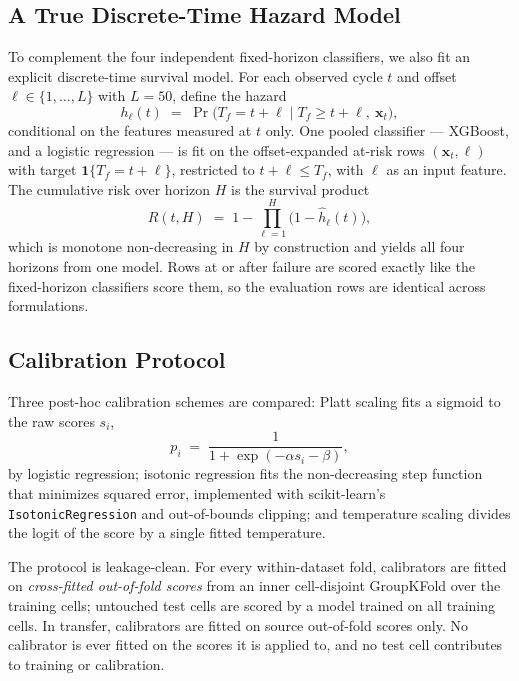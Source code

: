 \documentclass[preprint,12pt]{elsarticle}
\begin{document}
\subsection{A True Discrete-Time Hazard Model}
To complement the four independent fixed-horizon classifiers, we also fit an explicit discrete-time survival model. For each observed cycle $t$ and offset $\ell\in\{1,\dots,L\}$ with $L{=}50$, define the hazard
\begin{equation}\label{eq:hazard}
h_\ell(t) \;=\; \Pr\!\bigl(T_f = t{+}\ell \mid T_f \ge t{+}\ell,\ \mathbf{x}_t\bigr),
\end{equation}
conditional on the features measured at $t$ only. One pooled classifier --- XGBoost, and a logistic regression --- is fit on the offset-expanded at-risk rows $(\mathbf{x}_t, \ell)$ with target $\mathbf{1}\{T_f = t{+}\ell\}$, restricted to $t{+}\ell \le T_f$, with $\ell$ as an input feature. The cumulative risk over horizon $H$ is the survival product
\begin{equation}\label{eq:survival}
R(t,H) \;=\; 1 - \prod_{\ell=1}^{H}\bigl(1-\hat h_\ell(t)\bigr),
\end{equation}
which is monotone non-decreasing in $H$ by construction and yields all four horizons from one model. Rows at or after failure are scored exactly like the fixed-horizon classifiers score them, so the evaluation rows are identical across formulations.

\subsection{Calibration Protocol}
Three post-hoc calibration schemes are compared: Platt scaling fits a sigmoid to the raw scores $s_i$,
\begin{equation}\label{eq:platt}
p_i \;=\; \frac{1}{1+\exp(-\alpha s_i - \beta)},
\end{equation}
by logistic regression; isotonic regression \cite{zadrozny2002transforming} fits the non-decreasing step function that minimizes squared error, implemented with scikit-learn's \texttt{IsotonicRegression} and out-of-bounds clipping; and temperature scaling divides the logit of the score by a single fitted temperature.

The protocol is leakage-clean. For every within-dataset fold, calibrators are fitted on \emph{cross-fitted out-of-fold scores} from an inner cell-disjoint GroupKFold over the training cells; untouched test cells are scored by a model trained on all training cells. In transfer, calibrators are fitted on source out-of-fold scores only. No calibrator is ever fitted on the scores it is applied to, and no test cell contributes to training or calibration.
\end{document}
